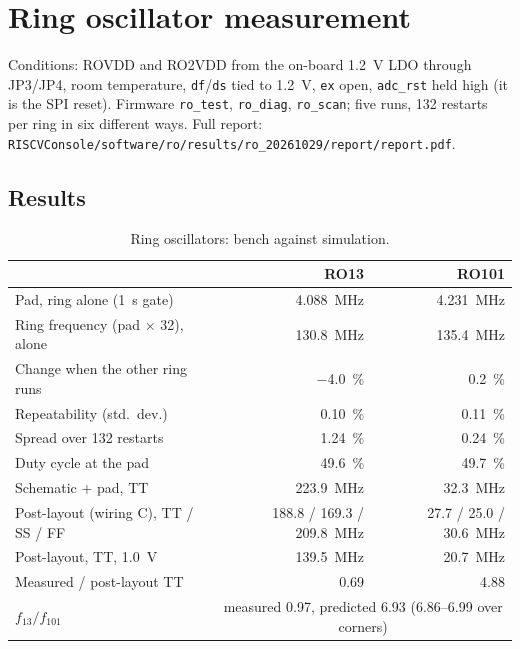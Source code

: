 \documentclass[10pt,a4paper]{article}
\begin{document}
\section{Ring oscillator measurement}
\label{sec:ro}
Conditions: ROVDD and RO2VDD from the on-board \SI{1.2}{V} LDO through JP3/JP4, room temperature,
\texttt{df}/\texttt{ds} tied to \SI{1.2}{V}, \texttt{ex} open, \texttt{adc\_rst} held high (it is the SPI
reset). Firmware \texttt{ro\_test}, \texttt{ro\_diag}, \texttt{ro\_scan}; five runs, 132 restarts per ring
in six different ways. Full report: \nolinkurl{RISCVConsole/software/ro/results/ro_20261029/report/report.pdf}.

\subsection{Results}
\begin{table}[H]\centering\small
\begin{tabular}{lrr}
\toprule
 & RO13 & RO101 \\
\midrule
Pad, ring alone (\SI{1}{s} gate) & \SI{4.088}{MHz} & \SI{4.231}{MHz} \\
Ring frequency (pad $\times$ 32), alone & \SI{130.8}{MHz} & \SI{135.4}{MHz} \\
Change when the other ring runs & \SI{-4.0}{\percent} & \SI{+0.2}{\percent} \\
Repeatability (std.\ dev.) & \SI{0.10}{\percent} & \SI{0.11}{\percent} \\
Spread over 132 restarts & \SI{1.24}{\percent} & \SI{0.24}{\percent} \\
Duty cycle at the pad & \SI{49.6}{\percent} & \SI{49.7}{\percent} \\
\midrule
Schematic + pad, TT & \SI{223.9}{MHz} & \SI{32.3}{MHz} \\
Post-layout (wiring C), TT / SS / FF & 188.8 / 169.3 / \SI{209.8}{MHz} & 27.7 / 25.0 / \SI{30.6}{MHz} \\
Post-layout, TT, \SI{1.0}{V} & \SI{139.5}{MHz} & \SI{20.7}{MHz} \\
\midrule
Measured / post-layout TT & 0.69 & 4.88 \\
$f_{13}/f_{101}$ & \multicolumn{2}{c}{measured 0.97, predicted 6.93 (6.86--6.99 over corners)} \\
\bottomrule
\end{tabular}
\caption{Ring oscillators: bench against simulation.}
\end{table}
\end{document}
